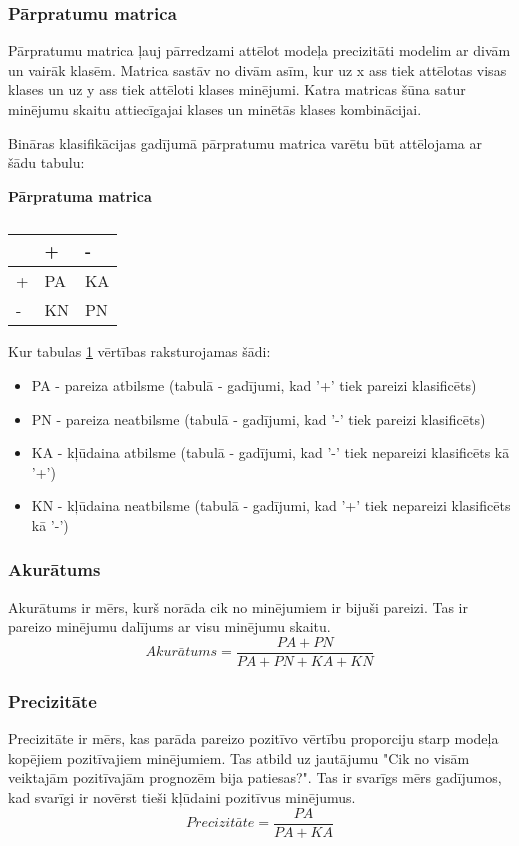 \subsubsection{Pārpratumu matrica}
Pārpratumu matrica ļauj pārredzami attēlot modeļa precizitāti modelim ar divām un vairāk klasēm. Matrica sastāv no divām asīm, kur uz x ass tiek attēlotas visas klases un uz y ass tiek attēloti klases minējumi. Katra matricas šūna satur minējumu skaitu attiecīgajai klases un minētās klases kombinācijai.

Bināras klasifikācijas gadījumā pārpratumu matrica varētu būt attēlojama ar šādu tabulu:
\begin{table}[H]
\centering
\caption{\label{tab:novertejums}}
\textbf{Pārpratuma matrica\\}
\begin{tabular}{|l|l|l|}
\hline
  & +  & -  \\ \hline
+ & PA & KA \\ \hline
- & KN & PN \\ \hline
\end{tabular}
\end{table}

Kur tabulas  \ref{tab:novertejums} vērtības raksturojamas šādi:
\begin{itemize}
\item PA - pareiza atbilsme (tabulā - gadījumi, kad '+' tiek pareizi klasificēts)
\item PN - pareiza neatbilsme (tabulā - gadījumi, kad '-' tiek pareizi klasificēts)
\item KA - kļūdaina atbilsme (tabulā - gadījumi, kad '-' tiek nepareizi klasificēts kā '+')
\item KN - kļūdaina neatbilsme (tabulā - gadījumi, kad '+' tiek nepareizi klasificēts kā '-')

\end{itemize}
\subsubsection{Akurātums}
Akurātums ir mērs, kurš norāda cik no minējumiem ir bijuši pareizi. Tas ir pareizo minējumu dalījums ar visu minējumu skaitu.
\begin{equation}
Akur\bar{a}tums = \frac{PA + PN}{PA + PN + KA + KN}
\end{equation}
\subsubsection{Precizitāte}
Precizitāte ir mērs, kas parāda pareizo pozitīvo vērtību proporciju starp modeļa kopējiem pozitīvajiem minējumiem. Tas atbild uz jautājumu "Cik no visām veiktajām pozitīvajām prognozēm bija patiesas?". Tas ir svarīgs mērs gadījumos, kad svarīgi ir novērst tieši kļūdaini pozitīvus minējumus.
\begin{equation}
Precizit\bar{a}te = \frac{PA}{PA + KA}
\end{equation}
